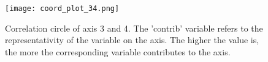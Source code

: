 \begin{figure} [!htbp]
	\begin{center}
		\texttt{[image: coord\_plot\_34.png]}
	\end{center}
	\caption{Correlation circle of axis 3 and 4. The 'contrib' variable refers to the representativity of the variable on the axis. The higher the value is, the more the corresponding variable contributes to the axis.}
	\label{fig:corr_circ_34}
\end{figure}

